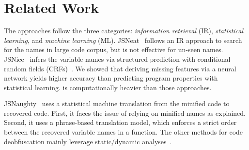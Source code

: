 \section{Related Work}
\label{related_section}


 The approaches
follow the three categories: {\em information retrieval} (IR), {\em
  statistical learning}, and {\em machine learning} (ML).
JSNeat~\cite{icse19} follows an IR approach to search for the names in
large code corpus, but is not effective for un-seen names.
JSNice~\cite{JSNice2015}
infers the variable names via structured prediction with
conditional random fields (CRFs)~\cite{JSNice2015}. We showed that
deriving missing features via a neural network yields higher accuracy
than predicting program properties with statistical learning.
{\tool} is computationally heavier than those approaches.


JSNaughty~\cite{JSNaughty2017} uses a statistical machine
translation from the minified code to recovered code. First, it
faces the issue of relying on minified names as explained.
Second, it uses a phrase-based translation model, which
enforces a strict order between the recovered variable names in a
function.
The other methods for code deobfuscation mainly leverage
static/dynamic
analyses~\cite{Christodorescu:2003:SAE:1251353.1251365,Moser:2007:EME:1263552.1264210,Udupa05deobfuscation:reverse}.


